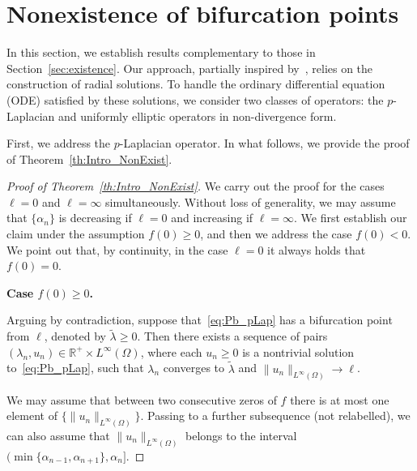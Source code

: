 \documentclass[10pt,twoside,english,reqno,a4paper]{amsart}
\theoremstyle{plain}
\theoremstyle{plain}
\theoremstyle{definition}
\theoremstyle{remark}
\numberwithin{equation}{section}
\newcommand{\R}{\mathbb{R}}
\def\lio{{L^{\infty}(\Omega)}}
\begin{document}
\section{Nonexistence of bifurcation points}
\label{sec:nonexistence}

In this section, we establish results complementary to those in Section~\ref{sec:existence}. Our approach, partially inspired by~\cite{DS87}, relies on the construction of radial solutions. To handle the ordinary differential equation (ODE) satisfied by these solutions, we consider two classes of operators: the $p$-Laplacian and uniformly elliptic operators in non-divergence form.

First, we address the $p$-Laplacian operator. In what follows, we provide the proof of Theorem~\ref{th:Intro_NonExist}.

\begin{proof}[Proof of Theorem~\ref{th:Intro_NonExist}]
We carry out the proof for the cases $\ell=0$ and $\ell=\infty$ simultaneously. Without loss of generality, we may assume that $\{\alpha_n\}$ is decreasing if $\ell=0$ and increasing if $\ell=\infty$. We first establish our claim under the assumption $f(0)\geq 0$, and then we address the case $f(0)<0$. We point out that, by continuity, in the case $\ell=0$ it always holds that $f(0)=0$.
\smallskip

\textbf{Case $f(0)\geq 0$.}

Arguing by contradiction, suppose that~\eqref{eq:Pb_pLap} has a bifurcation point from $\ell$, denoted by $\tilde\lambda \geq 0$. Then there exists a sequence of pairs $(\lambda_n, u_n) \in \R^+\times \lio$, where each $u_n\geq 0$ is a nontrivial solution to~\eqref{eq:Pb_pLap}, such that $\lambda_n$ converges to $\tilde\lambda$ and $\|u_n\|_\lio\to \ell$.

We may assume that between two consecutive zeros of $f$ there is at most one element of $\{\|u_n\|_\lio\}$. Passing to a further subsequence (not relabelled), we can also assume that $\|u_n\|_\lio$ belongs to the interval $(\min\{\alpha_{n-1}, \alpha_{n+1}\}, \alpha_n]$.


\end{proof}
\end{document}
